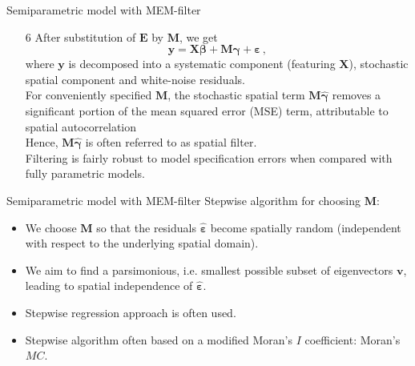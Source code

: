 \documentclass{beamer}
\begin{document}
\begin{frame}{Semiparametric model with MEM-filter}
\begin{itemize}
    \item[6] After substitution of $\bm{E}$ by $\bm{M}$, we get
\begin{equation*}
\bm{y} = \bm{X \beta } + \bm{M \gamma} + \bm{\varepsilon} \, ,
\end{equation*}
where $\bm{y}$ is decomposed into a systematic component (featuring $\bm{X}$), stochastic spatial component and white-noise residuals. 
\\ \medskip 
For conveniently specified $\bm{M}$, the stochastic spatial term $\bm{M \hat{\gamma}}$ removes a significant portion of the mean squared error (MSE) term, attributable to spatial autocorrelation 
\\ \medskip 
Hence, $\bm{M \hat{\gamma}}$ is often referred to as spatial filter. 
\\ \medskip 
Filtering is fairly robust to model specification errors when compared with fully parametric models.
\end{itemize}
\end{frame}
\begin{frame}{Semiparametric model with MEM-filter}
Stepwise algorithm for choosing $\bm{M}$:
\medskip
\begin{itemize}
    \item We choose $\bm{M}$ so that the residuals $\bm{\hat{\varepsilon}}$ become spatially random (independent with respect to the underlying spatial domain). 
    \smallskip
    \item We aim to find a parsimonious, i.e. smallest possible subset of eigenvectors $\bm{v}$, leading to spatial independence of $\bm{\hat{\varepsilon}}$.
    \smallskip
    \item Stepwise regression approach is often used.
    \smallskip
    \item Stepwise algorithm often based on a modified Moran's $I$ coefficient: Moran's $\textit{MC}$.
\end{itemize}
\end{frame}
\end{document}

